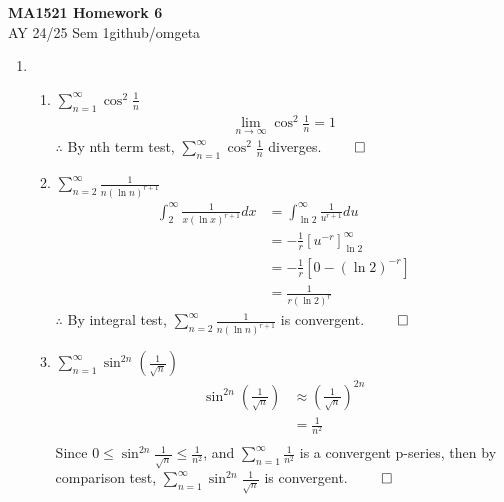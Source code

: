 \documentclass[12pt, a4paper]{article}
\newcommand{\mytitle}{MA1521 Homework 6}
\newcommand{\myauthor}{github/omgeta}
\newcommand{\mydate}{AY 24/25 Sem 1}
\begin{document}
\raggedright
\footnotesize
\begin{center}
{\normalsize{\textbf{\mytitle}}} \\
{\footnotesize{\mydate\hspace{2pt}\textemdash\hspace{2pt}\myauthor}}
\end{center}

\begin{enumerate}[Q\arabic*.]
  \item 
    \begin{enumerate}[(\alph*)]
      \item $\displaystyle \sum^{\infty}_{n=1}\cos^2\frac{1}{n}$
      \begin{align*}
        \lim_{n\rightarrow\infty}\cos^2\frac{1}{n} = 1
      \end{align*}
      $\therefore$ By nth term test, $\sum^{\infty}_{n=1}\cos^2\frac{1}{n}$ diverges. $\qed$ 

      \item $\displaystyle \sum^{\infty}_{n=2}\frac{1}{n(\ln n)^{r+1}}$
        \begin{align*}
        \int^{\infty}_2 \frac{1}{x(\ln x)^{r+1}} dx &= \int^{\infty}_{\ln 2}\frac{1}{u^{r+1}} du\tag*{(Sub $u=\ln x \implies dx = x du$)}\\
                                                    &= -\frac{1}{r}[u^{-r}]^{\infty}_{\ln 2}\\
                                                    &= -\frac{1}{r}[0 - (\ln  2)^{-r}]\\
                                                    &= \frac{1}{r(\ln 2)^r}
      \end{align*}
      $\therefore$ By integral test, $\sum^{\infty}_{n=2}\frac{1}{n(\ln n)^{r+1}}$ is convergent. $\qed$

    \item $\displaystyle \sum^{\infty}_{n=1} \sin^{2n}(\frac{1}{\sqrt{n}})$
      \begin{align*}
        \sin^{2n}(\frac{1}{\sqrt{n}}) &\approx (\frac{1}{\sqrt{n}})^{2n}\tag*{(For large $n$)}\\
                                      &= \frac{1}{n^2}\\
      \end{align*}
      Since $\displaystyle 0 \leq \sin^{2n}\frac{1}{\sqrt{n}} \leq \frac{1}{n^2}$, and $\displaystyle \sum^{\infty}_{n=1}\frac{1}{n^2}$ is a convergent p-series, then by comparison test, $\displaystyle \sum^{\infty}_{n=1} \sin^{2n}\frac{1}{\sqrt{n}}$ is convergent. $\qed$


\end{enumerate}
\end{enumerate}
\end{document}
